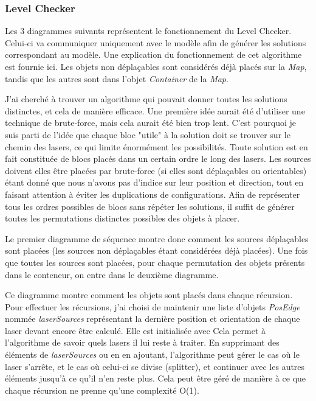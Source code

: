 \documentclass[]{article}
\begin{document}
\subsubsection{Level Checker}

Les 3 diagrammes suivants représentent le fonctionnement du Level Checker. Celui-ci va communiquer uniquement avec le modèle afin de générer les solutions correspondant au modèle. Une explication du fonctionnement de cet algorithme est fournie ici. Les objets non déplaçables sont considérés déjà placés sur la \emph{Map}, tandis que les autres sont dans l'objet \emph{Container} de la \emph{Map}.

J'ai cherché à trouver un algorithme qui pouvait donner toutes les solutions distinctes, et cela de manière efficace.
Une première idée aurait été d'utiliser une technique de brute-force, mais cela aurait été bien trop lent.
C'est pourquoi je suis parti de l'idée que chaque bloc "utile" à la solution doit se trouver sur le chemin des lasers, ce qui limite énormément les possibilités.
Toute solution est en fait constituée de blocs placés dans un certain ordre le long des lasers.
Les sources doivent elles être placées par brute-force (si elles sont déplaçables ou orientables) étant donné que nous n'avons pas d'indice sur leur position et direction, tout en faisant attention à éviter les duplications de configurations.
Afin de représenter tous les ordres possibles de blocs sans répéter les solutions, il suffit de générer toutes les permutations distinctes possibles des objets à placer.

Le premier diagramme de séquence montre donc comment les sources déplaçables sont placées (les sources non déplaçables étant considérées déjà placées). Une fois que toutes les sources sont placées, pour chaque permutation des objets présents dans le conteneur, on entre dans le deuxième diagramme.

Ce diagramme montre comment les objets sont placés dans chaque récursion. Pour effectuer les récursions, j'ai choisi de maintenir une liste d'objets \emph{PosEdge} nommée \emph{laserSources} représentant la dernière position et orientation de chaque laser devant encore être calculé. Elle est initialisée avec  Cela permet à l'algorithme de savoir quels lasers il lui reste à traiter. En supprimant des éléments de \emph{laserSources} ou en en ajoutant, l'algorithme peut gérer le cas où le laser s'arrête, et le cas où celui-ci se divise (splitter), et continuer avec les autres éléments jusqu'à ce qu'il n'en reste plus. Cela peut être géré de manière à ce que chaque récursion ne prenne qu'une complexité O(1).
\end{document}
